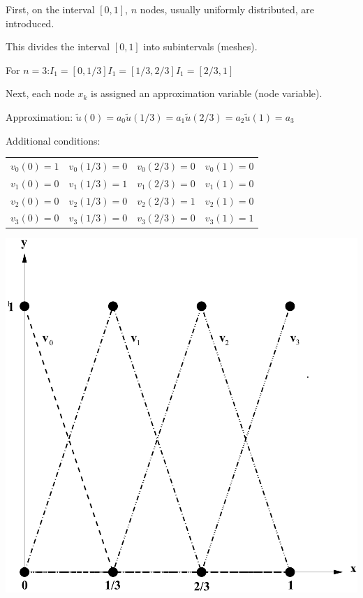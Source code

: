 \begin{minipage}[]{12cm}
First, on the interval $[0,1]$, $n$ nodes, usually uniformly distributed, are introduced.

\vspace{1cm}

This divides the interval $[0,1]$ into subintervals (meshes).

For $n=3$:\quad $I_1=[0,1/3]$\quad $I_1=[1/3,2/3]$\quad $I_1=[2/3,1]$

Next, each node $x_k$ is assigned an approximation variable (node variable).

Approximation: \quad $\tilde{u}(0)=a_0$\quad $\tilde{u}(1/3)=a_1$\quad $\tilde{u}(2/3)=a_2$\quad $\tilde{u}(1)=a_3$

Additional conditions:
\begin{tabular}{llll}
$v_0(0)=1$&$v_0(1/3)=0$&$v_0(2/3)=0$&$v_0(1)=0$\\
$v_1(0)=0$&$v_1(1/3)=1$&$v_1(2/3)=0$&$v_1(1)=0$\\
$v_2(0)=0$&$v_2(1/3)=0$&$v_2(2/3)=1$&$v_2(1)=0$\\
$v_3(0)=0$&$v_3(1/3)=0$&$v_3(2/3)=0$&$v_3(1)=1$\\
\end{tabular}
\end{minipage}
\hfill
\begin{minipage}[]{6cm}
\includegraphics[width=\linewidth]{Content/02_numerics/Traeger1.png}
\end{minipage}


